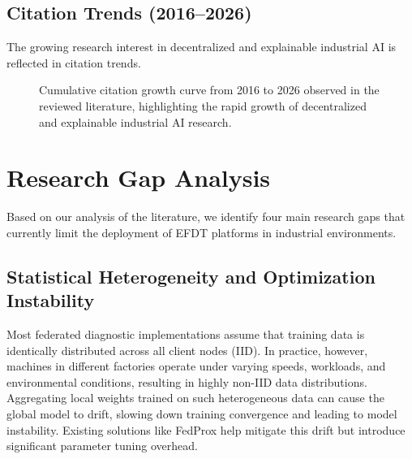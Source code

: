 \documentclass[journal,10pt,compsoc]{IEEEtran}
\begin{document}
\subsection{Citation Trends (2016--2026)}

The growing research interest in decentralized and explainable industrial AI is reflected in citation trends.

\begin{figure}[t]
\centering
{}
\caption{Cumulative citation growth curve from 2016 to 2026 observed in the reviewed literature, highlighting the rapid growth of decentralized and explainable industrial AI research.}
\label{fig:trend_citation}
\end{figure}

\section{Research Gap Analysis}
\label{sec:gaps_analysis}

Based on our analysis of the literature, we identify four main research gaps that currently limit the deployment of EFDT platforms in industrial environments.

\subsection{Statistical Heterogeneity and Optimization Instability}
Most federated diagnostic implementations assume that training data is identically distributed across all client nodes (IID). In practice, however, machines in different factories operate under varying speeds, workloads, and environmental conditions, resulting in highly non-IID data distributions. Aggregating local weights trained on such heterogeneous data can cause the global model to drift, slowing down training convergence and leading to model instability. Existing solutions like FedProx help mitigate this drift but introduce significant parameter tuning overhead.
\end{document}
